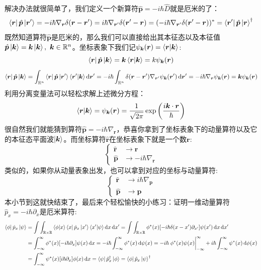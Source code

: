 解决办法就很简单了，我们定义一个新算符$\hat{\bm{p}}=-i\hbar\hat{D}$就是厄米的了：
\[\bra{\bm{r}}\hat{\bm{p}}\ket{\bm{r}'}=-i\hbar\nabla_{\bm{r}}\delta(\bm{r}-\bm{r}')=i\hbar\nabla_{\bm{r}'}\delta(\bm{r}'-\bm{r})=(-i\hbar\nabla_{\bm{r}'}\delta(\bm{r}'-\bm{r}))^*=\bra{\bm{r}'}\hat{\bm{p}}\ket{\bm{r}}^{\dagger}\]
既然知道算符$\hat{\bm{p}}$是厄米的，那么我们可以直接给出其本征态以及本征值$\hat{\bm{p}}\ket{\bm{k}}=\bm{k}\ket{\bm{k}}, \ \bm{k}\in\mathbb{R}^n$。坐标表象下我们记$\psi_{\bm{k}}(\bm{r})=\bra{\bm{r}}\ket{\bm{k}}$:
\[\bra{\bm{r}}\hat{\bm{p}}\ket{\bm{k}}=\bm{k}\bra{\bm{r}}\ket{\bm{k}}=k\psi_{\bm{k}}(\bm{r})\]
\[\bra{\bm{r}}\hat{\bm{p}}\ket{\bm{k}}=\int_{\mathbb{R}^n}\bra{\bm{r}}\hat{\bm{p}}\ket{\bm{r}'}\bra{\bm{r}'}\ket{\bm{k}}\dd{\bm{r}'}=-i\hbar\int_{\mathbb{R}^n}\delta(\bm{r}-\bm{r}')\nabla_{\bm{r}'}\psi_{\bm{k}}(\bm{r}')\dd{\bm{r}'}=-i\hbar\nabla_{\bm{r}}\psi_{\bm{k}}(\bm{r})=\bm{k}\psi_{\bm{k}}(\bm{r})\]
利用分离变量法可以轻松求解上述微分方程：
\[\bra{\bm{r}}\ket{\bm{k}}=\psi_{\bm{k}}(\bm{r})=\frac{1}{\sqrt{2\pi}}\exp\left(\frac{i\bm{k}\cdot\bm{r}}{\hbar}\right)\]
很自然我们就能猜到算符$\hat{\bm{p}}=-i\hbar\nabla_{\bm{r}}$，恭喜你拿到了坐标表象下的动量算符以及它的本征态平面波$\ket{\bm{k}}$。而坐标算符$\hat{\bm{r}}$在坐标表象下就是一个数$\bm{r}$:
\[\left\{\begin{aligned}
\hat{\bm{r}} & \to \bm{r} \\ \hat{\bm{p}} & \to -i\hbar\nabla_{\bm{r}}
\end{aligned}\right.\]
类似的，如果你从动量表象出发，也可以拿到对应的坐标与动量算符:
\[\left\{\begin{aligned}
\hat{\bm{r}} & \to i\hbar\nabla_{\bm{p}} \\ \hat{\bm{p}} & \to \bm{p}
\end{aligned}\right.\]
本小节到这就快结束了，最后来个轻松愉快的小练习：证明一维动量算符$\hat{p}_x=-i\hbar\partial_x$是厄米算符:
\[\begin{aligned}
\bra{\phi}\hat{p}_x\ket{\psi}&=\int\int_{\mathbb{R}\times\mathbb{R}}\bra{\phi}\ket{x}\bra{x}\hat{p}_x\ket{x'}\bra{x'}\ket{\psi}\dd{x}\dd{x'}=\int\int_{\mathbb{R}\times\mathbb{R}}\phi^*(x)[-i\hbar\delta(x-x')\partial_{x'}]\psi(x')\dd{x}\dd{x'}\\
&=\int_{-\infty}^{\infty}\phi^*(x)[-i\hbar\partial_{x}]\psi(x)\dd{x}=-i\hbar\int_{-\infty}^{\infty}\phi^*(x)\dd{\psi(x)}=-i\hbar\eval{\phi^*(x)\psi(x)}_{-\infty}^{\infty}+i\hbar\int_{-\infty}^{\infty}\psi^*(x)\dd{\phi(x)}\\
&=\int_{-\infty}^{\infty}\psi^*(x)[i\hbar\partial_x]\phi(x)\dd{x}=\bra{\psi}\hat{p}_x^{\dagger}\ket{\phi}=\bra{\phi}\hat{p}_x\ket{\psi}^{\dagger}
\end{aligned}\]

